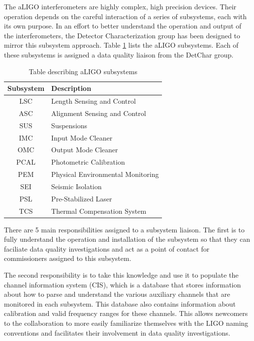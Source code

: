 The aLIGO interferometers are highly complex, high precision devices. 
Their operation depends on the careful interaction of a series of subsystems, 
each with its own purpose. In an effort to better understand the operation 
and output of the interferometers, the Detector Characterization group has 
been designed to mirror this subsystem approach. Table 
\ref{table:aligo-subsystems} lists the aLIGO subsystems. Each of these 
subsystems is assigned a data quality liaison from the DetChar group. 

\begin{table}[ht!]%
  \begin{center}
    \begin{tabular}{|c|l|}
    \hline
    Subsystem & Description \\
    \hline
    LSC & Length Sensing and Control \\
    \hline
    ASC & Alignment Sensing and Control \\
    \hline 
    SUS & Suspensions \\
    \hline
    IMC & Input Mode Cleaner \\
    \hline 
    OMC & Output Mode Cleaner \\
    \hline
    PCAL & Photometric Calibration \\
    \hline 
    PEM & Physical Environmental Monitoring \\
    \hline
    SEI & Seismic Isolation \\
    \hline
    PSL & Pre-Stabilized Laser \\
    \hline
    TCS & Thermal Compensation System \\
    \hline
    \end{tabular}
  \end{center}
  \caption[Table of aLIGO subsytems]{Table describing aLIGO subsystems}
  \label{table:aligo-subsystems}
\end{table}

There are 5 main responsibilities assigned to a subsystem liaison. The 
first is to fully understand the operation and installation of the subsystem 
so that they can faciliate data quality investigations and act as a 
point of contact for commissioners assigned to this subsystem.

The second responsibility 
is to take this knowledge and use it to populate the channel information 
system (CIS), which is a database that stores information about how to 
parse and understand the various auxiliary channels that are monitored 
in each subsystem. This database also contains information about calibration 
and valid frequency ranges for these channels. This allows newcomers to the 
collaboration to more easily familiarize themselves with the LIGO naming 
conventions and facilitates their involvement in data quality investigations.  

